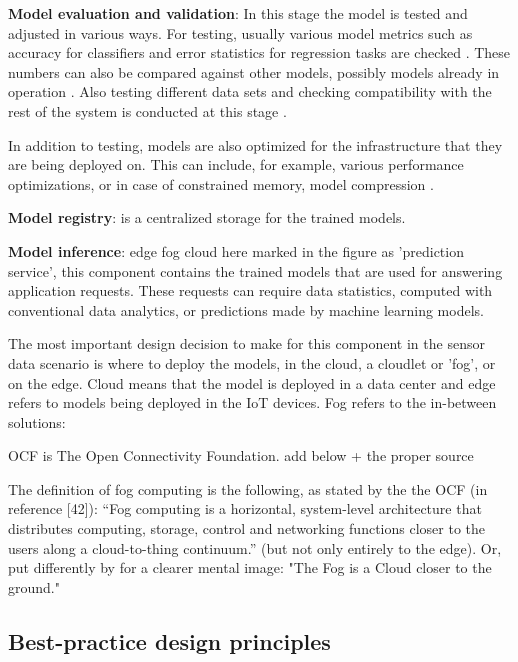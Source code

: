 \textbf{Model evaluation and validation}: In this stage the model is tested and adjusted in various ways. For testing, usually various model metrics such as accuracy for classifiers and error statistics for regression tasks are checked \cite{iotsurvey}. These numbers can also be compared against other models, possibly models already in operation \cite{googlemlops}. Also testing different data sets and checking compatibility with the rest of the system is conducted at this stage \cite{googlemlops}.

In addition to testing, models are also optimized for the infrastructure that they are being deployed on. This can include, for example, various performance optimizations, or in case of constrained memory, model compression \cite{iotsurvey}.

\textbf{Model registry}: is a centralized storage for the trained models. 


\textbf{Model inference}: edge fog cloud here marked in the figure as 'prediction service', this component contains the trained models that are used for answering application requests. These requests can require data statistics, computed with conventional data analytics, or predictions made by machine learning models.

The most important design decision to make for this component in the sensor data scenario is where to deploy the models, in the cloud, a cloudlet or 'fog', or on the edge. Cloud means that the model is deployed in a data center and edge refers to models being deployed in the IoT devices. Fog refers to the in-between solutions: 

OCF is The Open Connectivity Foundation. add below + the proper source

The definition of fog computing is the following, as stated by the the OCF (in \cite{fogsurvey} reference [42]): “Fog computing is a horizontal, system-level architecture that distributes computing, storage, control and networking functions closer to the users along a cloud-to-thing continuum.” (but not only entirely to the edge). Or, put differently by \cite{fogsurvey} for a clearer mental image: "The Fog is a Cloud closer to the ground."

\subsection{Best-practice design principles}


